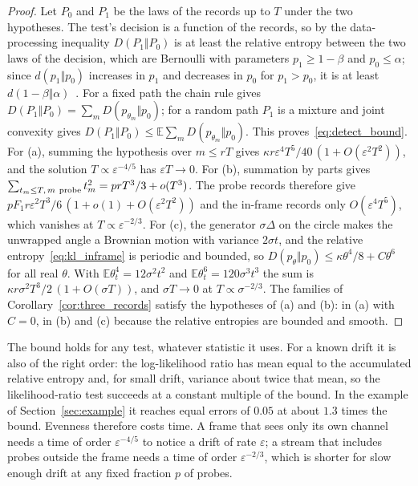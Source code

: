 \documentclass[12pt]{article}
\theoremstyle{definition}
\newcommand{\E}{\mathbb E}
\begin{document}
\begin{proof}
Let $P_0$ and $P_1$ be the laws of the records up to $T$ under the two hypotheses. The test's decision is a function of the records, so by the data-processing inequality $D(P_1\Vert P_0)$ is at least the relative entropy between the two laws of the decision, which are Bernoulli with parameters $p_1\ge1-\beta$ and $p_0\le\alpha$; since $d(p_1\Vert p_0)$ increases in $p_1$ and decreases in $p_0$ for $p_1>p_0$, it is at least $d(1-\beta\Vert\alpha)$~\cite{CoverThomas2006}. For a fixed path the chain rule gives $D(P_1\Vert P_0)=\sum_mD(p_{\theta_m}\Vert p_0)$; for a random path $P_1$ is a mixture and joint convexity gives $D(P_1\Vert P_0)\le\E\sum_mD(p_{\theta_m}\Vert p_0)$. This proves~\eqref{eq:detect_bound}. For (a), summing the hypothesis over $m\le rT$ gives $\kappa r\varepsilon^4T^5/40\,(1+O(\varepsilon^2T^2))$, and the solution $T\propto\varepsilon^{-4/5}$ has $\varepsilon T\to0$. For (b), summation by parts gives $\sum_{t_m\le T,\,m\ {\rm probe}}t_m^2=p rT^3/3+o(T^3)$. The probe records therefore give $pF_1r\varepsilon^2T^3/6\,(1+o(1)+O(\varepsilon^2T^2))$ and the in-frame records only $O(\varepsilon^4T^5)$, which vanishes at $T\propto\varepsilon^{-2/3}$. For (c), the generator $\sigma\Delta$ on the circle makes the unwrapped angle a Brownian motion with variance $2\sigma t$, and the relative entropy~\eqref{eq:kl_inframe} is periodic and bounded, so $D(p_\theta\Vert p_0)\le\kappa\theta^4/8+C\theta^6$ for all real $\theta$. With $\E\theta_t^4=12\sigma^2t^2$ and $\E\theta_t^6=120\sigma^3t^3$ the sum is $\kappa r\sigma^2T^3/2\,(1+O(\sigma T))$, and $\sigma T\to0$ at $T\propto\sigma^{-2/3}$. The families of Corollary~\ref{cor:three_records} satisfy the hypotheses of (a) and (b): in (a) with $C=0$, in (b) and (c) because the relative entropies are bounded and smooth.
\end{proof}

The bound holds for any test, whatever statistic it uses. For a known drift it is also of the right order: the log-likelihood ratio has mean equal to the accumulated relative entropy and, for small drift, variance about twice that mean, so the likelihood-ratio test succeeds at a constant multiple of the bound. In the example of Section~\ref{sec:example} it reaches equal errors of $0.05$ at about $1.3$ times the bound. Evenness therefore costs time. A frame that sees only its own channel needs a time of order $\varepsilon^{-4/5}$ to notice a drift of rate $\varepsilon$; a stream that includes probes outside the frame needs a time of order $\varepsilon^{-2/3}$, which is shorter for slow enough drift at any fixed fraction $p$ of probes.
\end{document}
